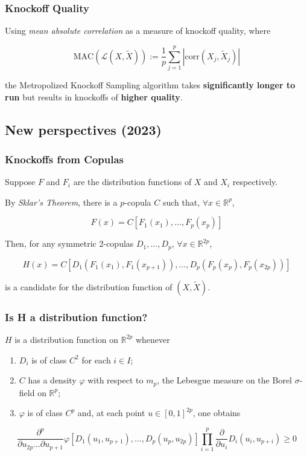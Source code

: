 \documentclass[
	11pt, %
]{beamer}
\begin{document}
\begin{frame}
	\frametitle{Knockoff Quality}
	
	Using \textit{mean absolute correlation} as a measure of knockoff quality, where
	
	$$\text{MAC}\left(\mathcal{L}\left(X,\tilde{X}\right)\right):=\frac{1}{p}\sum_{j=1}^p \left|\text{corr}\left(X_j,\tilde{X}_j\right)\right|$$
	
	\bigskip
	
	the Metropolized Knockoff Sampling algorithm takes \textbf{significantly longer to run} but results in knockoffs of \textbf{higher quality}.
\end{frame}

\subsection{New perspectives (2023)}

\begin{frame}
	\frametitle{Knockoffs from Copulas}
	
	Suppose $F$ and $F_i$ are the distribution functions of $X$ and $X_i$ respectively.
	
	\bigskip
	
	By \textit{Sklar's Theorem}, there is a $p$-copula $C$ such that, $\forall x\in\mathbb{R}^p$,
	
	$$F(x) = C\left[F_1(x_1),\dots,F_p(x_p)\right]$$
	
	\bigskip
	
	Then, for any symmetric 2-copulas $D_1,\dots,D_p$, $\forall x\in\mathbb{R}^{2p}$,
	
	$$H(x)=C\left[D_1\left(F_1(x_1),F_1(x_{p+1})\right),\dots,D_p\left(F_p(x_p),F_p(x_{2p})\right)\right]$$
	
	is a candidate for the distribution function of $(X,\tilde{X})$.
\end{frame}

\begin{frame}
	\frametitle{Is H a distribution function?}
	
	$H$ is a distribution function on $\mathbb{R}^{2p}$ whenever
	
	\begin{enumerate}
		\item $D_i$ is of class $C^2$ for each $i\in I$;
		\item $C$ has a density $\varphi$ with respect to $m_p$, the Lebesgue measure on the Borel $\sigma$-field on $\mathbb{R}^p$;
		\item $\varphi$ is of class $C^p$ and, at each point $u\in[0,1]^{2p}$, one obtains
	\end{enumerate}
	$${\scriptstyle \frac{\partial^p}{\partial u_{2p}\dots\partial u_{p+1}}\varphi\left[D_1(u_1,u_{p+1}),\dots,D_p(u_p,u_{2p})\right]\prod_{i=1}^{p}\frac{\partial}{\partial u_i}D_i(u_i,u_{p+i})\ge 0}$$
\end{frame}
\end{document}
